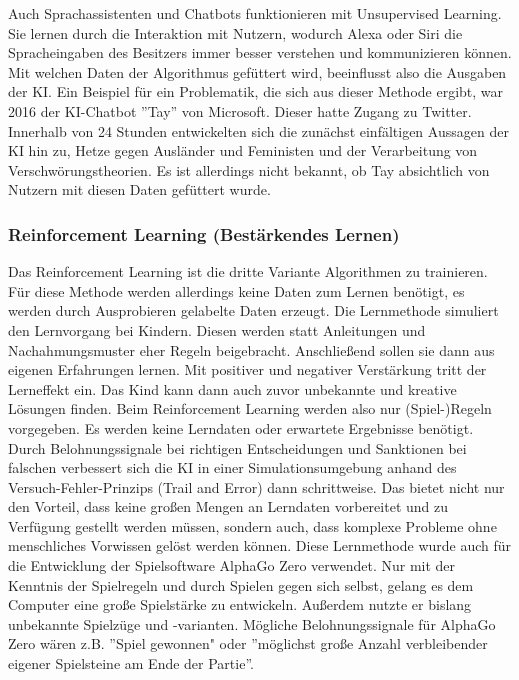 \documentclass[a4paper,12pt, german]{report}
\begin{document}
Auch Sprachassistenten und Chatbots funktionieren mit Unsupervised Learning. Sie lernen durch die Interaktion mit Nutzern, wodurch Alexa oder Siri die Spracheingaben des Besitzers immer besser verstehen und kommunizieren können. Mit welchen Daten der Algorithmus gefüttert wird, beeinflusst also die Ausgaben der KI. Ein Beispiel für ein Problematik, die sich aus dieser Methode ergibt, war 2016 der KI-Chatbot ''Tay'' von Microsoft. Dieser hatte Zugang zu Twitter. Innerhalb von 24 Stunden entwickelten sich die zunächst einfältigen Aussagen der KI hin zu, Hetze gegen Ausländer und Feministen und der Verarbeitung von Verschwörungstheorien. Es ist allerdings nicht bekannt, ob Tay absichtlich von Nutzern mit diesen Daten gefüttert wurde.\cite{13}

\subsubsection{Reinforcement Learning (Bestärkendes Lernen)} 

Das Reinforcement Learning ist die dritte Variante Algorithmen zu trainieren. Für diese Methode werden allerdings keine Daten zum Lernen benötigt, es werden durch Ausprobieren gelabelte Daten erzeugt.\cite{17} \newline
Die Lernmethode simuliert den Lernvorgang bei Kindern. Diesen werden statt Anleitungen und Nachahmungsmuster eher Regeln beigebracht. Anschließend sollen sie dann aus eigenen Erfahrungen lernen. Mit positiver und negativer Verstärkung tritt der Lerneffekt ein. Das Kind kann dann auch zuvor unbekannte und kreative Lösungen finden.
Beim Reinforcement Learning werden also nur (Spiel-)Regeln vorgegeben. Es werden keine Lerndaten oder erwartete Ergebnisse benötigt. Durch Belohnungssignale bei richtigen Entscheidungen und Sanktionen bei falschen verbessert sich die KI in einer Simulationsumgebung anhand des Versuch-Fehler-Prinzips (Trail and Error) dann schrittweise. Das bietet nicht nur den Vorteil, dass keine großen Mengen an Lerndaten vorbereitet und zu Verfügung gestellt werden müssen, sondern auch, dass komplexe Probleme ohne menschliches Vorwissen gelöst werden können.\cite{02}
\newline
Diese Lernmethode wurde auch für die Entwicklung der Spielsoftware AlphaGo Zero verwendet. Nur mit der Kenntnis der Spielregeln und durch Spielen gegen sich selbst, gelang es dem Computer eine große Spielstärke zu entwickeln. Außerdem nutzte er bislang unbekannte Spielzüge und -varianten. Mögliche Belohnungssignale für AlphaGo Zero wären z.B. ''Spiel gewonnen" oder ''möglichst große Anzahl verbleibender eigener Spielsteine am Ende der Partie''.\cite{02}
\end{document}
